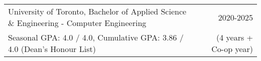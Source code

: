 \begin{tabularx}{\textwidth}{ @{}X r@{} }
    University of Toronto, Bachelor of Applied Science \& Engineering - Computer Engineering & 2020-2025 \\
    Seasonal GPA: 4.0 / 4.0, Cumulative GPA: 3.86 / 4.0 (Dean’s Honour List) & (4 years + Co-op year) \\
\end{tabularx}